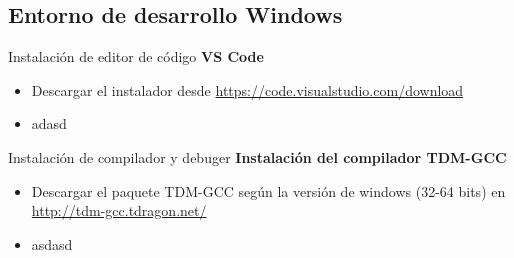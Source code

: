 \subsection{Entorno de desarrollo Windows}
\begin{frame}[fragile]{Instalación de editor de código}
  \textbf{VS Code}
  \begin{itemize}[<+(1)->]
  \item Descargar el instalador desde \url{https://code.visualstudio.com/download}
  \item adasd
  
 \end{itemize}
\end{frame}


\begin{frame}[fragile]{Instalación de compilador y debuger}
 \textbf{Instalación del compilador TDM-GCC}
 \begin{itemize}[<+(1)->]
  \item Descargar el paquete TDM-GCC según la versión de windows (32-64 bits) en \url{http://tdm-gcc.tdragon.net/}
  \item asdasd
 \end{itemize}
\end{frame}

